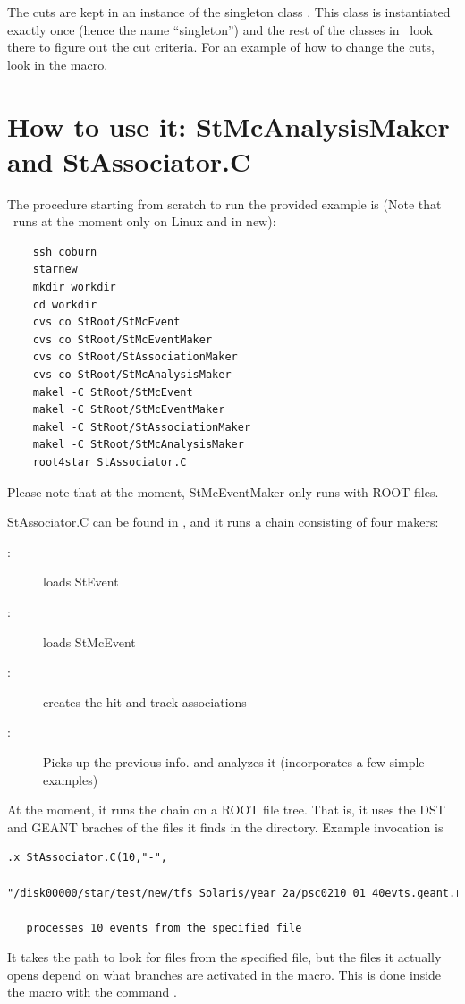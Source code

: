 The cuts are kept in an instance of the singleton class .  This
class is instantiated exactly once (hence the name ``singleton'') and the rest of
the classes in \StAssociationMaker\ look there to figure out the cut criteria.
For an example of how to change the cuts, look in the 
macro.  




\section{How to use it: StMcAnalysisMaker and StAssociator.C}
\label{sec:howto}
The procedure starting from scratch to run the provided 
example is (Note that \StAssociationMaker\ runs at the moment
only on Linux and in new):
\begin{verbatim}
    ssh coburn 
    starnew
    mkdir workdir
    cd workdir
    cvs co StRoot/StMcEvent
    cvs co StRoot/StMcEventMaker
    cvs co StRoot/StAssociationMaker
    cvs co StRoot/StMcAnalysisMaker
    makel -C StRoot/StMcEvent
    makel -C StRoot/StMcEventMaker
    makel -C StRoot/StAssociationMaker
    makel -C StRoot/StMcAnalysisMaker
    root4star StAssociator.C
\end{verbatim}

Please note that at the moment, StMcEventMaker only runs with ROOT files.

StAssociator.C can be found in , %
and it runs a 
chain consisting of four makers:
\begin{description}
\item[:] loads StEvent
\item[:] loads StMcEvent
\item[:] creates the hit and track associations
\item[:] Picks up the previous info. and analyzes it 
    (incorporates a few simple examples)
\end{description}


At the moment, it runs the chain on a ROOT file tree.  That is, it uses the DST
and GEANT braches of the files it finds in the directory.  Example invocation
is 
\begin{verbatim}
.x StAssociator.C(10,"-",
    "/disk00000/star/test/new/tfs_Solaris/year_2a/psc0210_01_40evts.geant.root")

   processes 10 events from the specified file

\end{verbatim}
It takes the path to look for files from the specified file, but the files it
actually opens depend on
what branches are activated in the macro.
This is done inside the macro with the command .


